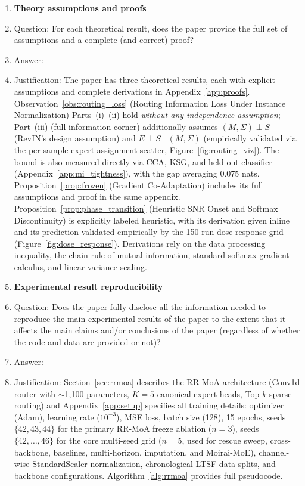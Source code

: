 \begin{enumerate}
\item {\bf Theory assumptions and proofs}
    \item[] Question: For each theoretical result, does the paper provide the full set of assumptions and a complete (and correct) proof?
    \item[] Answer: \answerYes{}
    \item[] Justification: The paper has three theoretical results, each with explicit assumptions and complete derivations in Appendix~\ref{app:proofs}. Observation~\ref{obs:routing_loss} (Routing Information Loss Under Instance Normalization) Parts~(i)--(ii) hold \emph{without any independence assumption}; Part~(iii) (full-information corner) additionally assumes $(M,\Sigma)\perp S$ (RevIN's design assumption) and $E\perp S\mid(M,\Sigma)$ (empirically validated via the per-sample expert assignment scatter, Figure~\ref{fig:routing_viz}). The bound is also measured directly via CCA, KSG, and held-out classifier (Appendix~\ref{app:mi_tightness}), with the gap averaging $0.075$ nats. Proposition~\ref{prop:frozen} (Gradient Co-Adaptation) includes its full assumptions and proof in the same appendix. Proposition~\ref{prop:phase_transition} (Heuristic SNR Onset and Softmax Discontinuity) is explicitly labeled heuristic, with its derivation given inline and its prediction validated empirically by the 150-run dose-response grid (Figure~\ref{fig:dose_response}). Derivations rely on the data processing inequality, the chain rule of mutual information, standard softmax gradient calculus, and linear-variance scaling.

    \item {\bf Experimental result reproducibility}
    \item[] Question: Does the paper fully disclose all the information needed to reproduce the main experimental results of the paper to the extent that it affects the main claims and/or conclusions of the paper (regardless of whether the code and data are provided or not)?
    \item[] Answer: \answerYes{}
    \item[] Justification: Section~\ref{sec:rrmoa} describes the RR-MoA architecture (Conv1d router with $\sim$1{,}100 parameters, $K{=}5$ canonical expert heads, Top-$k$ sparse routing) and Appendix~\ref{app:setup} specifies all training details: optimizer (Adam), learning rate ($10^{-3}$), MSE loss, batch size (128), 15 epochs, seeds $\{42,43,44\}$ for the primary RR-MoA freeze ablation ($n{=}3$), seeds $\{42,\dots,46\}$ for the core multi-seed grid ($n{=}5$, used for rescue sweep, cross-backbone, baselines, multi-horizon, imputation, and Moirai-MoE), channel-wise StandardScaler normalization, chronological LTSF data splits, and backbone configurations. Algorithm~\ref{alg:rrmoa} provides full pseudocode.


\end{enumerate}
